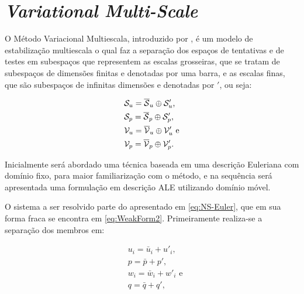 \section{\textit{Variational Multi-Scale}} \label{VMS}

O Método Variacional Multiescala, introduzido por , é um modelo de estabilização multiescala o qual faz a separação dos espaços de tentativas e de testes em subespaços que representem as escalas grosseiras, que se tratam de subespaços de dimensões finitas e denotadas por uma barra, e as escalas finas, que são subespaços de infinitas dimensões e denotadas por $'$, ou seja:

\begin{subequations}
    \begin{align}
         & \mathcal{S}_u=\overline{\mathcal{S}}_u\oplus\mathcal{S}'_u\text{,}  \\
         & \mathcal{S}_p=\overline{\mathcal{S}}_p\oplus\mathcal{S}'_p\text{,}  \\
         & \mathcal{V}_u=\overline{\mathcal{V}}_u\oplus\mathcal{V}'_u\text{ e} \\
         & \mathcal{V}_p=\overline{\mathcal{V}}_p\oplus\mathcal{V}'_p\text{.}
    \end{align}
\end{subequations}

Inicialmente será abordado uma técnica baseada em uma descrição Euleriana com domínio fixo, para maior familiarização com o método, e na sequência será apresentada uma formulação em descrição ALE utilizando domínio móvel.

O sistema a ser resolvido parte do apresentado em \ref{eq:NS-Euler}, que em sua forma fraca se encontra em \ref{eq:WeakForm2}. Primeiramente realiza-se a separação dos membros em:

\begin{subequations}
    \begin{align}
         & u_i=\bar{u}_i+u'_i\text{,}  \\
         & p=\bar{p}+p'\text{,}        \\
         & w_i=\bar{w}_i+w'_i\text{ e} \\
         & q=\bar{q}+q'\text{,}
    \end{align}
\end{subequations}

